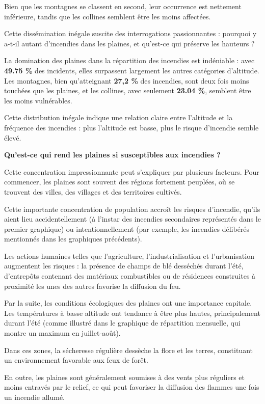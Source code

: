 \documentclass[
]{article}
\begin{document}
Bien que les montagnes se classent en second, leur occurrence est
nettement inférieure, tandis que les collines semblent être les moins
affectées.

Cette dissémination inégale suscite des interrogations passionnantes :
pourquoi y a-t-il autant d'incendies dans les plaines, et qu'est-ce qui
préserve les hauteurs ?

La domination des plaines dans la répartition des incendies est
indéniable : avec \textbf{49.75 \%} des incidents, elles surpassent
largement les autres catégories d'altitude. Les montagnes, bien
qu'atteignant \textbf{27,2 \%} des incendies, sont deux fois moins
touchées que les plaines, et les collines, avec seulement \textbf{23.04
\%}, semblent être les moins vulnérables.

Cette distribution inégale indique une relation claire entre l'altitude
et la fréquence des incendies : plus l'altitude est basse, plus le
risque d'incendie semble élevé.

\textbf{Qu'est-ce qui rend les plaines si susceptibles aux incendies ?}

Cette concentration impressionnante peut s'expliquer par plusieurs
facteurs. Pour commencer, les plaines sont souvent des régions fortement
peuplées, où se trouvent des villes, des villages et des territoires
cultivés.

Cette importante concentration de population accroît les risques
d'incendie, qu'ils aient lieu accidentellement (à l'instar des incendies
secondaires représentés dans le premier graphique) ou intentionnellement
(par exemple, les incendies délibérés mentionnés dans les graphiques
précédents).

Les actions humaines telles que l'agriculture, l'industrialisation et
l'urbanisation augmentent les risques : la présence de champs de blé
desséchés durant l'été, d'entrepôts contenant des matériaux combustibles
ou de résidences construites à proximité les unes des autres favorise la
diffusion du feu.

Par la suite, les conditions écologiques des plaines ont une importance
capitale. Les températures à basse altitude ont tendance à être plus
hautes, principalement durant l'été (comme illustré dans le graphique de
répartition mensuelle, qui montre un maximum en juillet-août).

Dans ces zones, la sécheresse régulière dessèche la flore et les terres,
constituant un environnement favorable aux feux de forêt.

En outre, les plaines sont généralement soumises à des vents plus
réguliers et moins entravés par le relief, ce qui peut favoriser la
diffusion des flammes une fois un incendie allumé.
\end{document}
